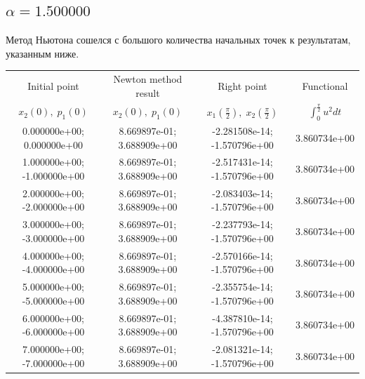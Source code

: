 \documentclass[titlepage]{article}
\def\l{\left}
\def\r{\right}
\begin{document}
\subsection{$\alpha = 1.500000$} 
Метод Ньютона сошелся с большого количества начальных точек к результатам, указанным ниже. \\ 
\begin{tabular}{ | c | c | c | c |} 
\hline 
Initial point  & Newton method result & Right point & Functional 
 \\ $x_2(0), \; p_1(0)$ & $x_2(0), \; p_1(0)$ & $x_1\l(\frac{\pi}{2}\r), \; x_2\l(\frac{\pi}{2}\r)$ & $\int_{0}^{\frac{\pi}{2}}u^2dt$  \\ \hline 
0.000000e+00; 0.000000e+00 & 8.669897e-01; 3.688909e+00 & -2.281508e-14; -1.570796e+00 & 3.860734e+00 \\ \hline 
1.000000e+00; -1.000000e+00 & 8.669897e-01; 3.688909e+00 & -2.517431e-14; -1.570796e+00 & 3.860734e+00 \\ \hline 
2.000000e+00; -2.000000e+00 & 8.669897e-01; 3.688909e+00 & -2.083403e-14; -1.570796e+00 & 3.860734e+00 \\ \hline 
3.000000e+00; -3.000000e+00 & 8.669897e-01; 3.688909e+00 & -2.237793e-14; -1.570796e+00 & 3.860734e+00 \\ \hline 
4.000000e+00; -4.000000e+00 & 8.669897e-01; 3.688909e+00 & -2.570166e-14; -1.570796e+00 & 3.860734e+00 \\ \hline 
5.000000e+00; -5.000000e+00 & 8.669897e-01; 3.688909e+00 & -2.355754e-14; -1.570796e+00 & 3.860734e+00 \\ \hline 
6.000000e+00; -6.000000e+00 & 8.669897e-01; 3.688909e+00 & -4.387810e-14; -1.570796e+00 & 3.860734e+00 \\ \hline 
7.000000e+00; -7.000000e+00 & 8.669897e-01; 3.688909e+00 & -2.081321e-14; -1.570796e+00 & 3.860734e+00 \\ \hline 
\end{tabular} 
\end{document}
